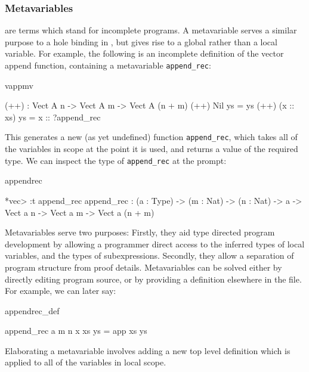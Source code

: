 \subsubsection{Metavariables}

 are terms which stand for incomplete programs. A
metavariable serves a similar
purpose to a hole binding in \TT{}, but gives rise to a global rather than a
local variable. For example, the following is an incomplete definition of
the vector append function, containing a metavariable \texttt{append\_rec}:

\begin{SaveVerbatim}{vappmv}

(++) : Vect A n -> Vect A m -> Vect A (n + m)
(++) Nil       ys = ys
(++) (x :: xs) ys = x :: ?append_rec

\end{SaveVerbatim}

This generates a new (as yet undefined)
function \texttt{append\_rec}, which takes all of the variables
in scope at the point it is used, and returns a value of the required type.
We can inspect the type of \texttt{append\_rec} at the \Idris{} prompt:

\begin{SaveVerbatim}{appendrec}

*vec> :t append_rec
append_rec : (a : Type) -> (m : Nat) -> (n : Nat) -> a -> 
             Vect a n -> Vect a m -> Vect a (n + m)

\end{SaveVerbatim}

Metavariables serve two purposes: Firstly, they aid type directed program development
by allowing a programmer direct access to the inferred types of local variables, and
the types of subexpressions. Secondly, they allow a separation of program structure
from proof details. Metavariables can be solved either by directly editing program
source, or by providing a definition elsewhere in the file. For example, we can later say:

\begin{SaveVerbatim}{appendrec_def}

append_rec a m n x xs ys = app xs ys

\end{SaveVerbatim}

Elaborating a metavariable involves adding a new top level definition which is applied
to all of the variables in local scope.

